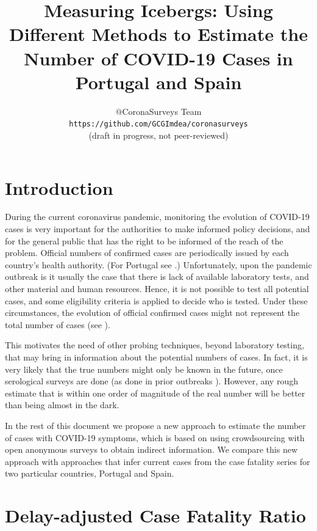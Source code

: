 \documentclass{article}
\begin{document}
\title{Measuring Icebergs: Using Different Methods to Estimate the Number of COVID-19 Cases in Portugal and Spain}
\author{$@$CoronaSurveys Team \\ \texttt{https://github.com/GCGImdea/coronasurveys}\\(draft in progress, not peer-reviewed)}
\maketitle
\section{Introduction}

During the current coronavirus pandemic, monitoring the evolution of COVID-19 cases is very important for the authorities to make
informed policy decisions, and for the general public that has the right to be informed of the reach of the problem. 
Official numbers of confirmed cases are periodically issued by each country's health authority. (For Portugal see \cite{DGS}.)
Unfortunately, upon the pandemic outbreak is it usually the case that there is lack of available laboratory tests, and other material and human resources. Hence, it is not possible to test all potential cases, and some eligibility criteria is applied to decide who is tested.
Under these circumstances, the evolution of official confirmed cases might not represent the total number of cases (see \cite{maxmen2020much}).  

This motivates the need of other probing techniques, beyond laboratory testing, that may bring in information about the potential numbers of cases. In fact, it is very likely that the true numbers might only be known in the future, once serological surveys are done (as done in prior outbreaks \cite{yang2012serological}). However, any rough estimate that is within one order of magnitude of the real number will be better than being almost in the dark.

In the rest of this document we propose a new approach to estimate the number of cases with COVID-19 symptoms, which is based on using crowdsourcing with open anonymous surveys to obtain indirect information. We compare this new approach with approaches that infer current cases from the case fatality series for two particular countries, Portugal and Spain.

\section{Delay-adjusted Case Fatality Ratio}
\end{document}
